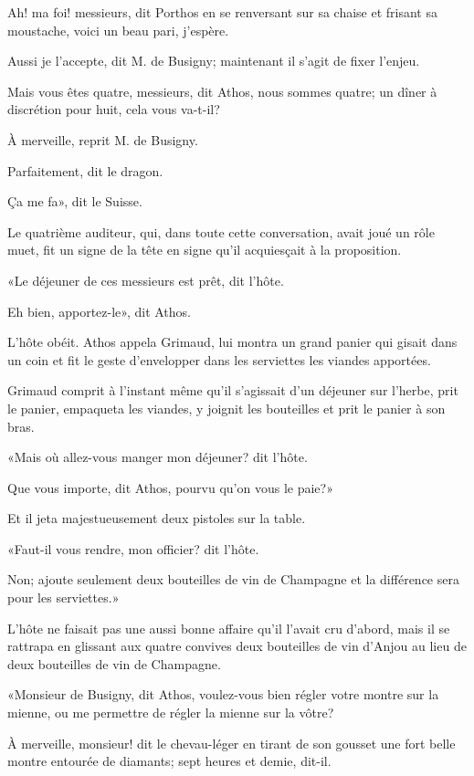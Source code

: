 \speak  Ah! ma foi! messieurs, dit Porthos en se renversant sur sa chaise et frisant sa moustache, voici un beau pari, j'espère. 

\speak  Aussi je l'accepte, dit M. de Busigny; maintenant il s'agit de fixer l'enjeu. 

\speak  Mais vous êtes quatre, messieurs, dit Athos, nous sommes quatre; un dîner à discrétion pour huit, cela vous va-t-il? 

\speak  À merveille, reprit M. de Busigny. 

\speak  Parfaitement, dit le dragon. 

\speak  Ça me fa», dit le Suisse. 

Le quatrième auditeur, qui, dans toute cette conversation, avait joué un rôle muet, fit un signe de la tête en signe qu'il acquiesçait à la proposition. 

«Le déjeuner de ces messieurs est prêt, dit l'hôte. 

\speak  Eh bien, apportez-le», dit Athos. 

L'hôte obéit. Athos appela Grimaud, lui montra un grand panier qui gisait dans un coin et fit le geste d'envelopper dans les serviettes les viandes apportées. 

Grimaud comprit à l'instant même qu'il s'agissait d'un déjeuner sur l'herbe, prit le panier, empaqueta les viandes, y joignit les bouteilles et prit le panier à son bras. 

«Mais où allez-vous manger mon déjeuner? dit l'hôte. 

\speak  Que vous importe, dit Athos, pourvu qu'on vous le paie?» 

Et il jeta majestueusement deux pistoles sur la table. 

«Faut-il vous rendre, mon officier? dit l'hôte. 

\speak  Non; ajoute seulement deux bouteilles de vin de Champagne et la différence sera pour les serviettes.» 

L'hôte ne faisait pas une aussi bonne affaire qu'il l'avait cru d'abord, mais il se rattrapa en glissant aux quatre convives deux bouteilles de vin d'Anjou au lieu de deux bouteilles de vin de Champagne. 

«Monsieur de Busigny, dit Athos, voulez-vous bien régler votre montre sur la mienne, ou me permettre de régler la mienne sur la vôtre? 

\speak  À merveille, monsieur! dit le chevau-léger en tirant de son gousset une fort belle montre entourée de diamants; sept heures et demie, dit-il. 

